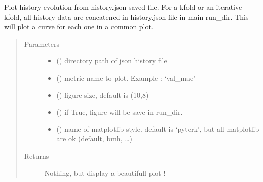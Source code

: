 \documentclass[letterpaper,10pt,english]{sphinxmanual}
\begin{document}
\begin{fulllineitems}
\label{\detokenize{pyterk:pyterk.reporter.plot_history}}
\sphinxAtStartPar
Plot history evolution from history.json saved file.
For a kfold or an iterative kfold, all history data are concatened in history.json file in main run\_dir.
This will plot a curve for each one in a common plot.
\begin{quote}\begin{description}
\item[{Parameters}] \leavevmode\begin{itemize}
\item {} 
\sphinxAtStartPar
{} () \textendash{} directory path of json history file

\item {} 
\sphinxAtStartPar
{} () \textendash{} metric name to plot. Example : ‘val\_mae’

\item {} 
\sphinxAtStartPar
{} () \textendash{} figure size, default is (10,8)

\item {} 
\sphinxAtStartPar
{} () \textendash{} if True, figure will be save in run\_dir.

\item {} 
\sphinxAtStartPar
{} () \textendash{} name of matplotlib style. default is ‘pyterk’, but all matplotlib are ok (default, bmh, …)

\end{itemize}

\item[{Returns}] \leavevmode
\sphinxAtStartPar
Nothing, but display a beautifull plot !

\end{description}\end{quote}

\end{fulllineitems}
\end{document}

